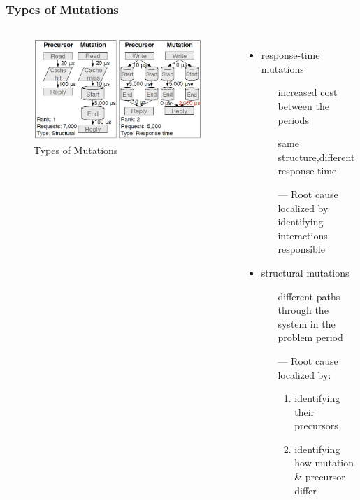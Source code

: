 \documentclass[11pt]{beamer}
\begin{document}
\begin{frame}
\frametitle{Types of Mutations}
\begin{columns}
\begin{figure}[htbp]
\centering
\includegraphics[width=.95\textwidth]{res/mutation.jpg}
\caption{Types of Mutations}
\label{fig:mutation}
\end{figure}
\begin{itemize}
  \item response-time mutations
  \begin{itemize}
    \item[\ding{43}]increased cost between the periods
    \item[\ding{43}]same structure,different response time
    \vskip5pt
    \item[---] Root cause localized by
    identifying interactions responsible
  \end{itemize}
  \vskip10pt
  \item structural mutations
  \begin{itemize}
    \item[\ding{43}] different paths through the system in the problem period
    \vskip5pt
    \item[---]Root cause localized by:
    \begin{enumerate}
      \item identifying their precursors
      \item identifying how mutation \& precursor differ
    \end{enumerate}
  \end{itemize}
\end{itemize}
\end{columns}
\end{frame}
\end{document}
